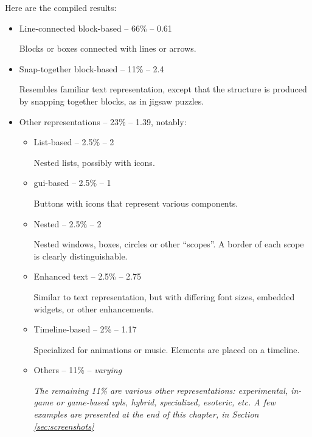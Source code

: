 Here are the compiled results:
\begin{itemize}
    \item Line-connected block-based -- 66\% -- 0.61
    
    Blocks or boxes connected with lines or arrows.
    
    
    \item Snap-together block-based -- 11\% -- 2.4
    
    Resembles familiar text representation, except that the structure is produced by snapping together blocks, as in jigsaw puzzles.
    
    
    \item Other representations -- 23\% -- 1.39, notably:
    \begin{itemize}
        \item List-based -- 2.5\% -- 2
        
        Nested lists, possibly with icons. 
        
        
        \item \acrshort{gui}-based -- 2.5\% -- 1
        
        Buttons with icons that represent various components.
        
        
        \item Nested -- 2.5\% -- 2
        
        Nested windows, boxes, circles or other ``scopes''. A border of each scope is clearly distinguishable.
        
        
        \item Enhanced text -- 2.5\% -- 2.75
        
        Similar to text representation, but with differing font sizes, embedded widgets, or other enhancements.
        
        
        \item Timeline-based -- 2\% -- 1.17
        
        Specialized for animations or music. Elements are placed on a timeline.
        
        
        \item Others -- 11\% -- \textit{varying}
        
        \textit{The remaining 11\% are various other representations: experimental, in-game or game-based \acrshort{vpl}s, hybrid, specialized, esoteric, etc. A few examples are presented at the end of this chapter, in Section \ref{sec:screenshots}}
  
    \end{itemize}
\end{itemize}

